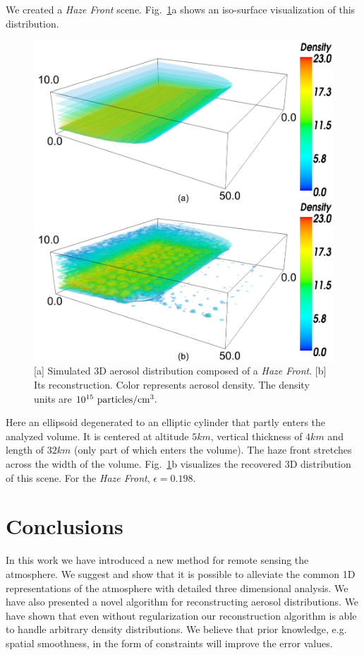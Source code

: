 \documentclass[10pt,twocolumn,letterpaper]{article}
\newcommand{\yoavcomment}[1]{}
\renewcommand{\yoavcomment}[1]{#1} %
\begin{document}
We created a {\em Haze Front} scene. Fig.~\ref{fig:simulation2}a shows an iso-surface visualization of this distribution.
\begin{figure}
  \centering
  \yoavcomment{\includegraphics[width=\columnwidth]{images/simulation2}}
  \caption{\small [a] Simulated 3D aerosol distribution composed of a {\em Haze Front}. [b] Its reconstruction. Color represents aerosol density. The density units are
  $10^{15}~{\rm particles}/{\rm cm}^3.$}
  \label{fig:simulation2}
\end{figure}
Here an ellipsoid degenerated to an elliptic cylinder that partly enters the analyzed volume. It is centered at altitude $5km$, vertical thickness of $4km$ and length of $32km$ (only part of which enters the volume). The haze front stretches across the width of the volume.  
Fig.~\ref{fig:simulation2}b visualizes the recovered 3D distribution of this scene. For the {\em Haze Front}, $\epsilon=0.198$.


\section{Conclusions}
\label{sec:conclusions}

In this work we have introduced a new method for remote sensing the
atmosphere. We suggest and show that it is possible to alleviate  the common 1D representations of the atmosphere with detailed three  dimensional analysis.
We have also presented a novel algorithm for reconstructing aerosol distributions. We have shown that even without regularization our
reconstruction algorithm is able to handle arbitrary density distributions.
We believe that prior knowledge, e.g. spatial smoothness, in the form
of constraints will improve the error values.
\end{document}
